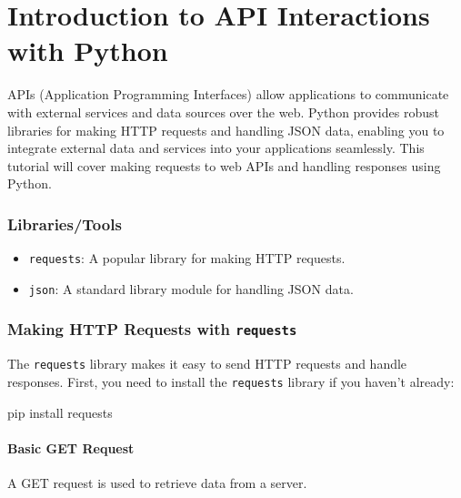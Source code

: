 \documentclass[
  letterpaper,
  DIV=11,
  numbers=noendperiod]{scrreprt}
\newenvironment{Shaded}{\begin{snugshade}}{\end{snugshade}}
\newcommand{\ExtensionTok}[1]{\textcolor[rgb]{0.00,0.23,0.31}{#1}}
\newcommand{\NormalTok}[1]{\textcolor[rgb]{0.00,0.23,0.31}{#1}}
\providecommand{\tightlist}{%
  \setlength{\itemsep}{0pt}\setlength{\parskip}{0pt}}\usepackage{longtable,booktabs,array}
\begin{document}

\chapter{Introduction to API Interactions with
Python}\label{introduction-to-api-interactions-with-python}

APIs (Application Programming Interfaces) allow applications to
communicate with external services and data sources over the web. Python
provides robust libraries for making HTTP requests and handling JSON
data, enabling you to integrate external data and services into your
applications seamlessly. This tutorial will cover making requests to web
APIs and handling responses using Python.

\subsection{Libraries/Tools}\label{librariestools}

\begin{itemize}
\tightlist
\item
  \texttt{requests}: A popular library for making HTTP requests.
\item
  \texttt{json}: A standard library module for handling JSON data.
\end{itemize}

\subsection{\texorpdfstring{Making HTTP Requests with
\texttt{requests}}{Making HTTP Requests with requests}}\label{making-http-requests-with-requests}

The \texttt{requests} library makes it easy to send HTTP requests and
handle responses. First, you need to install the \texttt{requests}
library if you haven't already:

\begin{Shaded}
\begin{Highlighting}[]
\ExtensionTok{pip}\NormalTok{ install requests}
\end{Highlighting}
\end{Shaded}

\subsubsection{Basic GET Request}\label{basic-get-request}

A GET request is used to retrieve data from a server.
\end{document}
